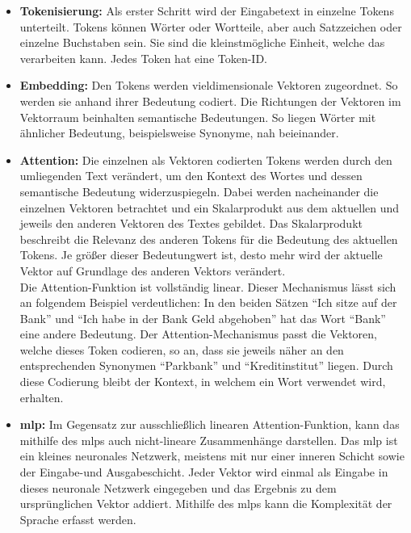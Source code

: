 \documentclass[../main.tex]{subfiles}
\begin{document}
\begin{itemize}

\item \textbf{Tokenisierung:} Als erster Schritt wird der Eingabetext in einzelne Tokens unterteilt. Tokens können Wörter oder Wortteile, aber auch Satzzeichen oder einzelne Buchstaben sein. Sie sind die kleinstmögliche Einheit, welche das  verarbeiten kann. Jedes Token hat eine Token-ID.\cite{architecture}

\item \textbf{Embedding:} Den Tokens werden vieldimensionale Vektoren zugeordnet. So werden sie anhand ihrer Bedeutung codiert. Die Richtungen der Vektoren im Vektorraum beinhalten semantische Bedeutungen. So liegen Wörter mit ähnlicher Bedeutung, beispielsweise Synonyme, nah beieinander.\cite{embedding}

\item \textbf{Attention:} Die einzelnen als Vektoren codierten Tokens werden durch den umliegenden Text verändert, um den Kontext des Wortes und dessen semantische Bedeutung widerzuspiegeln. Dabei werden nacheinander die einzelnen Vektoren betrachtet und ein Skalarprodukt aus dem aktuellen und jeweils den anderen Vektoren des Textes gebildet. Das Skalarprodukt beschreibt die Relevanz des anderen Tokens für die Bedeutung des aktuellen Tokens. Je größer dieser Bedeutungwert ist, desto mehr wird der aktuelle Vektor auf Grundlage des anderen Vektors verändert.\\
Die Attention-Funktion ist vollständig linear. Dieser Mechanismus lässt sich an folgendem Beispiel verdeutlichen: In den beiden Sätzen "`Ich sitze auf der Bank"' und "`Ich habe in der Bank Geld abgehoben"' hat das Wort "`Bank"' eine andere Bedeutung. Der Attention-Mechanismus passt die Vektoren, welche dieses Token codieren, so an, dass sie jeweils näher an den entsprechenden Synonymen "`Parkbank"' und "`Kreditinstitut"' liegen. Durch diese Codierung bleibt der Kontext, in welchem ein Wort verwendet wird, erhalten.\cite{attention, attention2} 

\item \textbf{\acrfull{mlp}:} Im Gegensatz zur ausschließlich linearen Attention-Funktion, kann das  mithilfe des \acrshort{mlp}s auch nicht-lineare Zusammenhänge darstellen. Das \acrshort{mlp} ist ein kleines neuronales Netzwerk, meistens mit nur einer inneren Schicht sowie der Eingabe-und Ausgabeschicht. Jeder Vektor wird einmal als Eingabe in dieses neuronale Netzwerk eingegeben und das Ergebnis zu dem ursprünglichen Vektor addiert. Mithilfe des \acrshort{mlp}s kann die Komplexität der Sprache erfasst werden.


\end{itemize}
\end{document}
